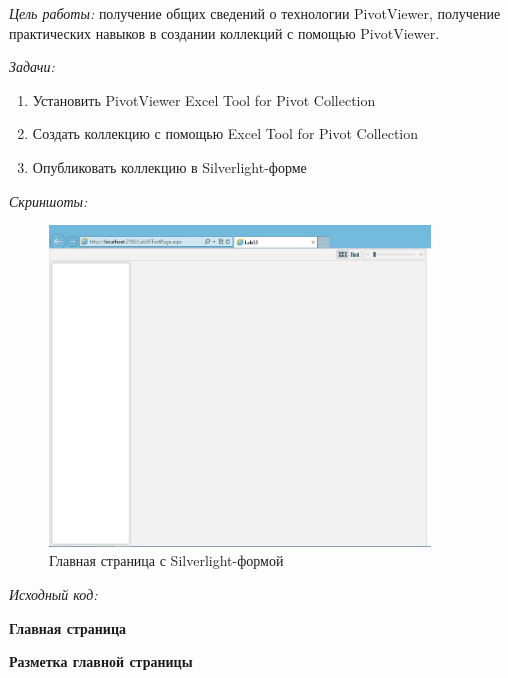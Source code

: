 \documentclass[pscyr, nonums]{hedlab}
\date{}
\begin{document}
    \makeheader
    \emph{Цель работы:} получение общих сведений о технологии PivotViewer, получение практических навыков в создании коллекций с помощью PivotViewer.

    \emph{Задачи:}
    \begin{enumerate}\itemsep-5pt
        \item Установить PivotViewer Excel Tool for Pivot Collection
        \item Создать коллекцию с помощью Excel Tool for Pivot Collection
        \item Опубликовать коллекцию в Silverlight-форме
    \end{enumerate}

    \emph{Скриншоты:}
    \begin{figure}[ht]
        \center
        \includegraphics[width=0.9\textwidth]{Lab08_01}
        \caption{Главная страница с Silverlight-формой}
    \end{figure}

    \pagebreak

    \emph{Исходный код:}
    \begin{center}
        \textbf{Главная страница}
    \end{center}
    

    \begin{center}
        \textbf{Разметка главной страницы}
    \end{center}
    
\end{document}
